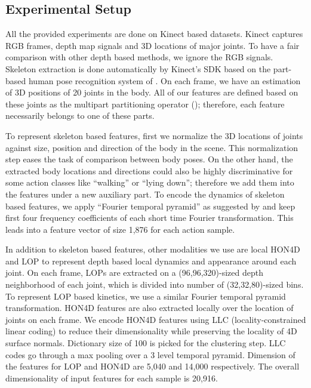 \documentclass[9pt,technote,compsoc]{IEEEtran}
\begin{document}
\subsection{Experimental Setup}
All the provided experiments are done on Kinect based datasets. Kinect captures RGB frames, depth map signals and 3D locations of major joints. To have a fair comparison with other depth based methods, we ignore the RGB signals. Skeleton extraction is done automatically by Kinect's SDK based on the part-based human pose recognition system of \cite{shotton2011CVPR}. On each frame, we have an estimation of 3D positions of 20 joints in the body. All of our features are defined based on these joints as the multipart partitioning operator (); therefore, each feature necessarily belongs to one of these parts.

To represent skeleton based features, first we normalize the 3D locations of joints against size, position and direction of the body in the scene. This normalization step eases the task of comparison between body poses. On the other hand, the extracted body locations and directions could also be highly discriminative for some action classes like ``walking'' or ``lying down''; therefore we add them into the features under a new auxiliary part. To encode the dynamics of skeleton based features, we apply ``Fourier temporal pyramid'' as suggested by \cite{actionletPAMI} and keep first four frequency coefficients of each short time Fourier transformation. This leads into a feature vector of size 1,876 for each action sample.

In addition to skeleton based features, other modalities we use are local HON4D \cite{HON4D} and LOP \cite{actionletPAMI} to represent depth based local dynamics and appearance around each joint. On each frame, LOPs are extracted on a (96,96,320)\--sized depth neighborhood of each joint, which is divided into  number of (32,32,80)\--sized bins. To represent LOP based kinetics, we use a similar Fourier temporal pyramid transformation. HON4D features are also extracted locally over the location of joints on each frame. We encode HON4D features using LLC (locality-constrained linear coding) \cite{LLC} to reduce their dimensionality while preserving the locality of 4D surface normals. Dictionary size of 100 is picked for the clustering step. LLC codes go through a max pooling over a 3 level temporal pyramid. Dimension of the features for LOP and HON4D are 5,040 and 14,000 respectively. The overall dimensionality of input features for each sample is 20,916.
\end{document}
